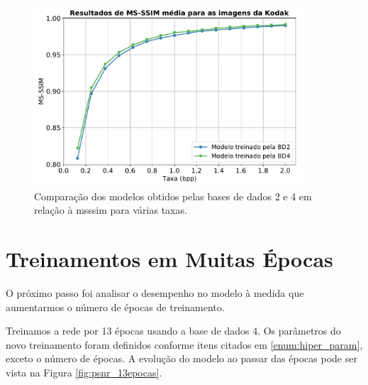 \begin{figure}[H]
	\centering
	\includegraphics[width=0.9\textwidth]{figuras/msssim_db2_db4.pdf}
	\caption[Comparação dos resultados das bases de dados 2 e 4 em relação à \acrshort{msssim}]{Comparação dos modelos obtidos pelas bases de dados 2 e 4 em relação à \acrshort{msssim} para várias taxas.} 
	\label{fig:msssim_db2_db4}
\end{figure}





\section{Treinamentos em Muitas Épocas}
O próximo passo foi analisar o desempenho no modelo à medida que aumentarmos o número de épocas de treinamento.


Treinamos a rede por 13 épocas usando a base de dados 4. Os parâmetros do novo treinamento foram definidos conforme itens citados em \ref{enum:hiper_param}, exceto o número de épocas. A evolução do modelo ao passar das épocas pode ser vista na Figura \ref{fig:psnr_13epocas}. 

